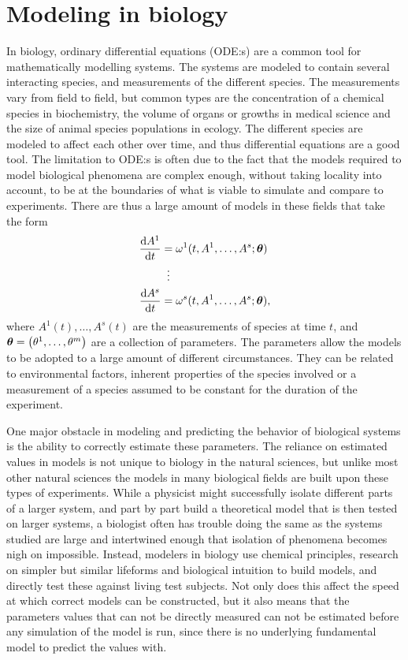 \chapter{Modeling in biology} \label{ch:models}

In biology, ordinary differential equations (ODE:s) are a common tool for mathematically modelling systems.
The systems are modeled to contain several interacting species, and measurements of the different species.
The measurements vary from field to field, but common types are the concentration of a chemical species in biochemistry, the volume of organs or growths in medical science and the size of animal species populations in ecology.
The different species are modeled to affect each other over time, and thus differential equations are a good tool.
The limitation to ODE:s is often due to the fact that the models required to model biological phenomena are complex enough, without taking locality into account, to be at the boundaries of what is viable to simulate and compare to experiments.
There are thus a large amount of models in these fields that take the form
\begin{align}
  \begin{split} \label{eq:generic-bio-ode}
    \diff{A^1}{t} &= \omega^1(t, A^1, \dots, A^s; \vb*{\theta}) \\
    &\equalsvdots \\
    \diff{A^s}{t} &= \omega^s(t, A^1, \dots, A^s; \vb*{\theta}),
  \end{split}
\end{align}
where \(A^1(t), \dots, A^s(t)\) are the measurements of species at time \(t\), and \(\vb*{\theta} = \left(\theta^1, \dots, \theta^m\right)\) are a collection of parameters.
The parameters allow the models to be adopted to a large amount of different circumstances.
They can be related to environmental factors, inherent properties of the species involved or a measurement of a species assumed to be constant for the duration of the experiment.

One major obstacle in modeling and predicting the behavior of biological systems is the ability to correctly estimate these parameters.
The reliance on estimated values in models is not unique to biology in the natural sciences, but unlike most other natural sciences the models in many biological fields are built upon these types of experiments.
While a physicist might successfully isolate different parts of a larger system, and part by part build a theoretical model that is then tested on larger systems, a biologist often has trouble doing the same as the systems studied are large and intertwined enough that isolation of phenomena becomes nigh on impossible.
Instead, modelers in biology use chemical principles, research on simpler but similar lifeforms and biological intuition to build models, and directly test these against living test subjects.
Not only does this affect the speed at which correct models can be constructed, but it also means that the parameters values that can not be directly measured can not be estimated before any simulation of the model is run, since there is no underlying fundamental model to predict the values with.

